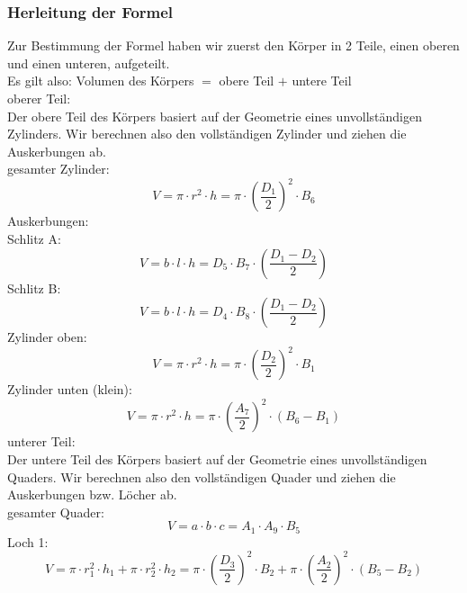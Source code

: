 \subsubsection*{Herleitung der Formel}
Zur Bestimmung der Formel haben wir zuerst den Körper in 2 Teile, einen oberen und einen unteren, aufgeteilt.\\
Es gilt also: Volumen des Körpers $=$ obere Teil $+$ untere Teil\\
oberer Teil:\\
Der obere Teil des Körpers basiert auf der Geometrie eines unvollständigen Zylinders. Wir berechnen also den vollständigen Zylinder und ziehen die Auskerbungen ab.\\
gesamter Zylinder:
  \begin{equation}
    V=\pi\cdot r^{2} \cdot h = \pi \cdot \left(\frac{D_1}{2} \right)^2 \cdot B_6 
  \end{equation}
Auskerbungen:\\
Schlitz A:
  \begin{equation}
    V = b \cdot l \cdot h = D_5 \cdot B_7 \cdot\left(\frac{D_1 - D_2 }{2} \right)
  \end{equation} 
Schlitz B: 
  \begin{equation}
    V = b \cdot l \cdot h = D_4 \cdot B_8 \cdot\left(\frac{D_1 - D_2 }{2} \right)
  \end{equation} 
Zylinder oben:
  \begin{equation}
    V=\pi\cdot r^{2} \cdot h = \pi \cdot \left(\frac{D_2}{2} \right)^2 \cdot B_1
  \end{equation} 
Zylinder unten (klein):
  \begin{equation}
    V=\pi\cdot r^{2} \cdot h = \pi \cdot \left(\frac{A_7}{2} \right)^2 \cdot (B_6 - B_1)
  \end{equation} 
unterer Teil:\\
Der untere Teil des Körpers basiert auf der Geometrie eines unvollständigen Quaders. Wir berechnen also den vollständigen Quader und ziehen die Auskerbungen bzw. Löcher ab.\\
gesamter Quader: 
  \begin{equation}
    V = a \cdot b \cdot c = A_1 \cdot A_9 \cdot B_5 
  \end{equation}
Loch 1: 
  \begin{equation}
    V = \pi\cdot r_1^{2} \cdot h_1 + \pi\cdot r_2^{2} \cdot h_2 = \pi \cdot \left(\frac{D_3}{2} \right)^2 \cdot B_2 + \pi \cdot \left(\frac{A_2}{2} \right)^2 \cdot (B_5 - B_2) 
  \end{equation}
